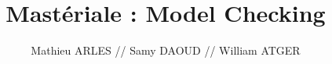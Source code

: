 \documentclass[a4paper,11pt]{article}
\title{Mastériale : Model Checking}
\author{Mathieu ARLES // Samy DAOUD // William ATGER}
\begin{document}
\maketitle
\tableofcontents

\begin{abstract}
\end{abstract}

\section{}
\end{document}
